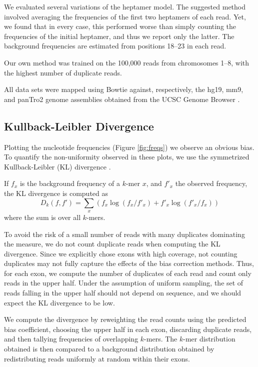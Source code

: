 \documentclass{bioinfo}
\begin{document}
We evaluated several variations of the heptamer model. The suggested method
involved averaging the frequencies of the first two heptamers of each read. Yet,
we found that in every case, this performed worse than simply counting the
frequencies of the initial heptamer, and thus we report only the latter. The
background frequencies are estimated from positions 18--23 in each read.

Our own method was trained on the 100,000 reads from chromosomes 1--8, with the
highest number of duplicate reads.

All data sets were mapped using Bowtie \citep{Langmead2009} against,
respectively, the hg19, mm9, and panTro2 genome assemblies obtained from the
UCSC Genome Browser \citep{Karolchik2008}.



\subsection{Kullback-Leibler Divergence}



Plotting the nucleotide frequencies (Figure  \ref{fig:freqs}) we observe an
obvious bias. To quantify the non-uniformity observed in these plots, we use the
symmetrized Kullback-Leibler (KL) divergence \citep{Kullback1951}.

If $f_x$ is the background frequency of a $k$-mer $x$, and $f'_x$ the observed
frequency, the KL divergence is computed as
$$D_k( f, f' ) = \sum_{x} \left( f_x \log( f_x / f'_x ) + f'_x \log( f'_x / f_x) \right)$$
where the sum is over all $k$-mers.


To avoid the risk of a small number of reads with many duplicates dominating the
measure, we do not count duplicate reads when computing the KL divergence. Since we
explicitly chose exons with high coverage, not counting duplicates may not
fully capture the effects of the bias correction methods. Thus, for each exon,
we compute the number of duplicates of each read and count only reads in the
upper half. Under the assumption of uniform sampling, the set of reads falling
in the upper half should not depend on sequence, and we should expect the KL
divergence to be low.

We compute the divergence by reweighting the read counts using the predicted
bias coefficient, choosing the upper half in each exon, discarding duplicate
reads, and then tallying frequencies of overlapping $k$-mers. The $k$-mer
distribution obtained is then compared to a background distribution obtained by
redistributing reads uniformly at random within their exons.
\end{document}
